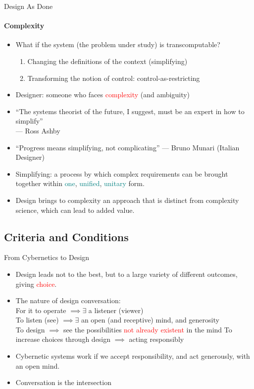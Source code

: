 \documentclass[
	11pt,
	aspectratio=169,
]{beamer}
\begin{document}
            \begin{frame}{Design As Done}
            \framesubtitle{Complexity}
    		    \begin{itemize}
    		        \item<1-> What if the system (the problem under study) is transcomputable?
                        \begin{enumerate}
                            \item Changing the definitions of the context (simplifying)
                            \item Transforming the notion of control: control-as-restricting
                        \end{enumerate}
    		        \item<1-> Designer: someone who faces \textcolor{red}{complexity} (and ambiguity)
                    \item<2-> ``The systems theorist of the future, I suggest, must be an expert in how to simplify'' \\--- Ross Ashby
                    \item<3-> ``Progress means simplifying, not complicating'' --- Bruno Munari (Italian Designer)
                    \item<4-> Simplifying: a process by which complex requirements can be brought together within \textcolor{teal}{one}, \textcolor{teal}{unified}, \textcolor{teal}{unitary} form.
                    \item<4-> Design brings to complexity an approach that is distinct from complexity science, which can lead to added value.
    		    \end{itemize}
            \end{frame}
        \subsection{Criteria and Conditions}
            \begin{frame}{From Cybernetics to Design}
    		    \begin{itemize}
    		        \item<1-> Design leads not to the best, but to a large variety of different outcomes, giving \textcolor{red}{choice}.
    		        \item<2-> The nature of design conversation:\\
    		        For it to operate $\implies \exists$ a listener (viewer)\\
    		        To listen (see) $\implies \exists$ an open (and receptive) mind, and generosity\\
    		        To design $\implies$ see the possibilities \textcolor{red}{not already existent} in the mind
    		        To increase choices through design $\implies$ acting responsibly
    		        \item<3-> Cybernetic systems work if we accept responsibility, and act generously, with an open mind.
    		        \item<4-> Conversation is the intersection
    		    \end{itemize}
            \end{frame}
\end{document}
